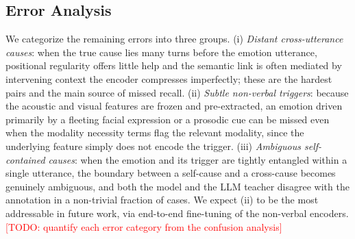 \documentclass[journal]{IEEEtran}
\newcommand{\todo}[1]{\textcolor{red}{[TODO: #1]}}
\begin{document}
\subsection{Error Analysis}
We categorize the remaining errors into three groups. (i) \emph{Distant cross-utterance
causes}: when the true cause lies many turns before the emotion utterance, positional
regularity offers little help and the semantic link is often mediated by intervening context
the encoder compresses imperfectly; these are the hardest pairs and the main source of missed
recall. (ii) \emph{Subtle non-verbal triggers}: because the acoustic and visual features are
frozen and pre-extracted, an emotion driven primarily by a fleeting facial expression or a
prosodic cue can be missed even when the modality necessity terms flag the relevant modality,
since the underlying feature simply does not encode the trigger. (iii) \emph{Ambiguous
self-contained causes}: when the emotion and its trigger are tightly entangled within a single
utterance, the boundary between a self-cause and a cross-cause becomes genuinely ambiguous, and
both the model and the LLM teacher disagree with the annotation in a non-trivial fraction of
cases. We expect (ii) to be the most addressable in future work, via end-to-end fine-tuning of
the non-verbal encoders. \todo{quantify each error category from the confusion analysis}
\end{document}
